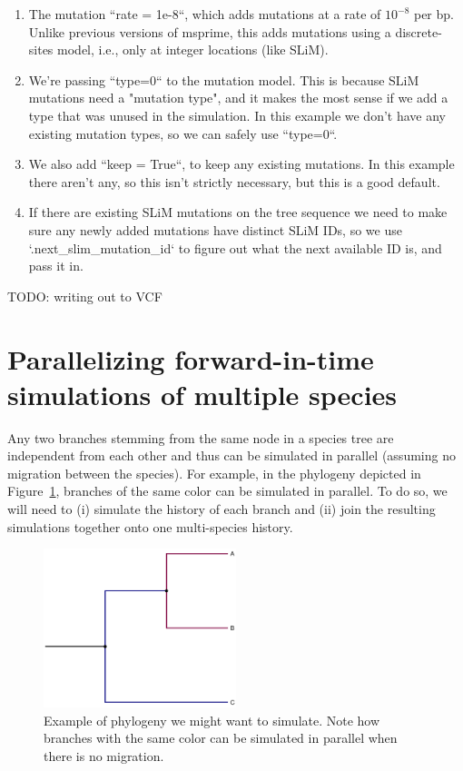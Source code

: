 \documentclass[12pt]{article}
\begin{document}
\begin{enumerate}
    \item The mutation ``rate = 1e-8``, which adds mutations at a rate of $10^{-8}$ per bp.
    Unlike previous versions of msprime, this adds mutations using a discrete-sites model,
    i.e., only at integer locations (like SLiM).

\item We're passing ``type=0`` to the mutation model.
    This is because SLiM mutations need a "mutation type",
    and it makes the most sense if we add a type that was unused in the simulation.
    In this example we don't have any existing mutation types, so we can safely use ``type=0``.

\item We also add ``keep = True``, to keep any existing mutations.
    In this example there aren't any, so this isn't strictly necessary,
    but this is a good default.

\item If there are existing SLiM mutations on the tree sequence we need to
    make sure any newly added mutations have distinct SLiM IDs,
    so we use `.next\_slim\_mutation\_id` to figure out
    what the next available ID is, and pass it in.

\end{enumerate}

TODO: writing out to VCF


\section*{Parallelizing forward-in-time simulations of multiple species}

Any two branches stemming from the same node in a species tree are independent from each other and
thus can be simulated in parallel (assuming no migration between the species).
For example, in the phylogeny depicted in Figure~\ref{fig:phylo},
branches of the same color can be simulated in parallel.
To do so, we will need to
(i) simulate the history of each branch and
(ii) join the resulting simulations together onto one multi-species history.

 \begin{figure}[h!]
 \centering
  \includegraphics[width=0.5\textwidth]{./code/parallelizing_phylogeny/phylo.pdf}
  \caption{Example of phylogeny we might want to simulate. Note how branches with the same color can be simulated in parallel when there is no migration.}
  \label{fig:phylo}
 \end{figure}
\end{document}
